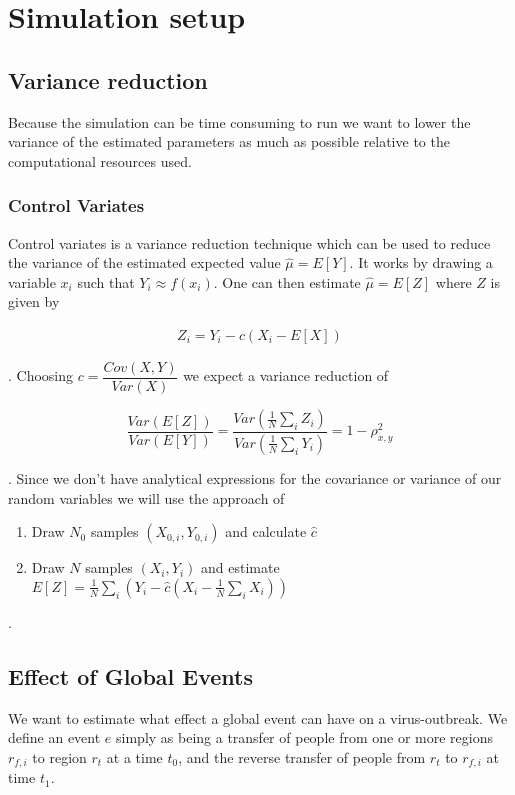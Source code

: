 \section{Simulation setup}
\subsection{Variance reduction}
Because the simulation can be time consuming to run we want to lower the variance of the estimated parameters as much as possible relative to the computational resources used. 

\subsubsection{Control Variates}
Control variates is a variance reduction technique which can be used to reduce the variance of the estimated expected value $\hat{\mu} =E[Y]$. It works by drawing a variable $x_i$ such that $Y_i \approx f(x_i)$. One can then estimate $\hat{\mu} =E[Z]$ where $Z$ is given by

\begin{align}
Z_i = Y_i - c (X_i - E[X]) 
\end{align}

. Choosing $c = \dfrac{Cov(X, Y)}{Var(X)}$ we expect a variance reduction of

\begin{equation}
\frac{Var(E[Z])}{Var(E[Y])} = \frac{ Var(\frac{1}{N} \sum_i Z_i) }{ Var(\frac{1}{N} \sum_i Y_i )} = 1 - \rho_{x, y}^2
\end{equation}

. Since we don't have analytical expressions for the covariance or variance of our random variables we will use the approach of

\begin{enumerate}
	\item Draw $N_0$ samples $(X_{0,i}, Y_{0, i})$ and calculate $\hat{c}$
	\item Draw $N$ samples $(X_i, Y_i)$ and estimate $E[Z] = \frac{1}{N} \sum_i \left( Y_i - \hat{c} (X_i - \frac{1}{N}\sum_i X_i) \right)  $
\end{enumerate}

.

\subsection{Effect of Global Events}
We want to estimate what effect a global event can have on a virus-outbreak. We define an event $e$ simply as being a transfer of people from one or more regions $r_{f, i}$ to region $r_t$ at a time $t_0$, and the reverse transfer of people from $r_t$ to $r_{f, i}$ at time $t_1$.

